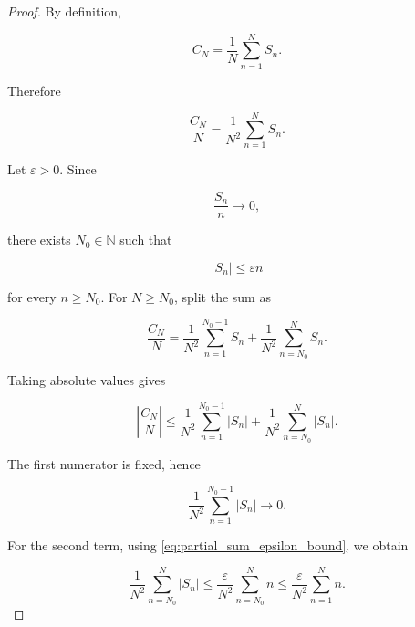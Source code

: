 \documentclass[11pt]{amsart}
\numberwithin{equation}{section}
\theoremstyle{plain}
\theoremstyle{definition}
\theoremstyle{remark}
\begin{document}
\begin{proof}
By definition,

\begin{equation}
C_N
=
\frac{1}{N}\sum_{n=1}^{N}S_n.
\label{eq:sublinear_centroid_definition_used}
\end{equation}

Therefore

\begin{equation}
\frac{C_N}{N}
=
\frac{1}{N^2}\sum_{n=1}^{N}S_n.
\label{eq:centroid_over_N_average_partial_sums}
\end{equation}

Let \(\varepsilon>0\). Since

\begin{equation}
\frac{S_n}{n}\longrightarrow 0,
\label{eq:partial_sum_normalized_n_limit}
\end{equation}

there exists \(N_0\in\mathbb{N}\) such that

\begin{equation}
|S_n|\leq \varepsilon n
\label{eq:partial_sum_epsilon_bound}
\end{equation}

for every \(n\geq N_0\). For \(N\geq N_0\), split the sum as

\begin{equation}
\frac{C_N}{N}
=
\frac{1}{N^2}\sum_{n=1}^{N_0-1}S_n
+
\frac{1}{N^2}\sum_{n=N_0}^{N}S_n.
\label{eq:centroid_sum_split}
\end{equation}

Taking absolute values gives

\begin{equation}
\left|\frac{C_N}{N}\right|
\leq
\frac{1}{N^2}\sum_{n=1}^{N_0-1}|S_n|
+
\frac{1}{N^2}\sum_{n=N_0}^{N}|S_n|.
\label{eq:centroid_sum_split_abs}
\end{equation}

The first numerator is fixed, hence

\begin{equation}
\frac{1}{N^2}\sum_{n=1}^{N_0-1}|S_n|
\longrightarrow 0.
\label{eq:centroid_initial_block_vanishes}
\end{equation}

For the second term, using \eqref{eq:partial_sum_epsilon_bound}, we
obtain

\begin{equation}
\frac{1}{N^2}\sum_{n=N_0}^{N}|S_n|
\leq
\frac{\varepsilon}{N^2}\sum_{n=N_0}^{N}n
\leq
\frac{\varepsilon}{N^2}\sum_{n=1}^{N}n.
\label{eq:centroid_tail_bound}
\end{equation}


\end{proof}
\end{document}
